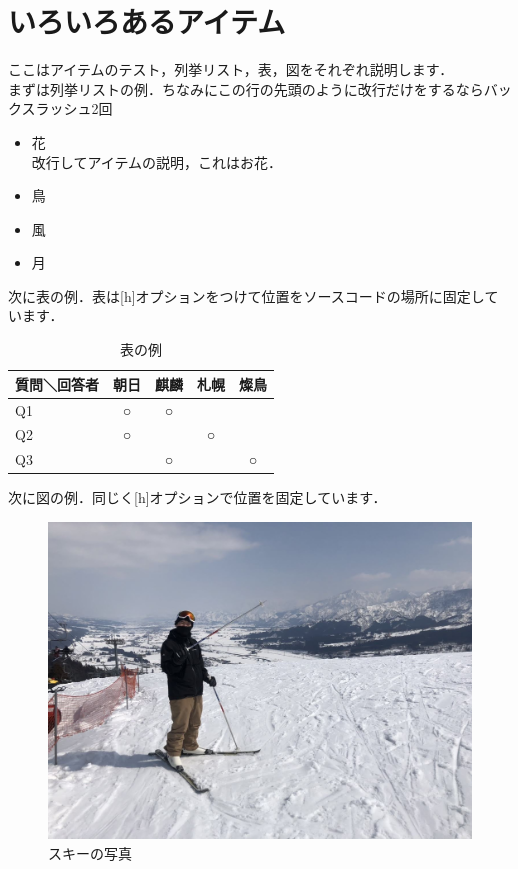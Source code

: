 \documentclass[a4j, twocolumn, 9pt]{jsarticle}
\begin{document}
\section{いろいろあるアイテム}
ここはアイテムのテスト，列挙リスト，表，図をそれぞれ説明します．\\
まずは列挙リストの例．ちなみにこの行の先頭のように改行だけをするならバックスラッシュ2回
\begin{itemize}
  \item 花\\
  改行してアイテムの説明，これはお花．
  \item 鳥
  \item 風
  \item 月
\end{itemize}
\par
次に表の例．表は[h]オプションをつけて位置をソースコードの場所に固定しています．
\begin{table}[h]
  \caption{表の例}
  \centering

  \begin{tabular}{|l||c|c|c|c|}
    \hline
    質問＼回答者 & 朝日 & 麒麟 & 札幌 & 燦鳥 \\
     \hline \hline
     Q1 & ○ & ○ & &\\
     \hline
     Q2 & ○ &  & ○ &\\
     \hline
     Q3 &  & ○ & & ○ \\
     \hline
  \end{tabular}
\end{table}
\par
次に図の例．同じく[h]オプションで位置を固定しています．
\begin{figure}[h]
  \centering
  \includegraphics[width=\linewidth]{imgs/ski.jpg}
  \caption{スキーの写真}
\end{figure}
\end{document}
